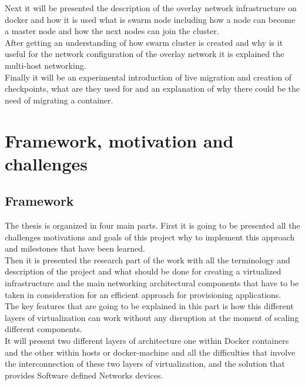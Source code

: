 Next it will be presented the description of the overlay network infrastructure on docker and how it is used what is swarm node including how a node can become a master node and how the next nodes can join the cluster.\\

After getting an understanding of how swarm cluster is created and why is it useful for the network configuration of the overlay network it is explained the multi-host networking.\\

Finally it will be an experimental introduction of live migration and creation of checkpoints, what are they used for and an explanation of why there could be the need of migrating a container.\\
 
\chapter{Framework, motivation and challenges} %

\label{ch:framework, motivation and challenges}

\section{Framework}

The thesis is organized in four main parts. First it is going to be presented all the challenges motivations and goals of this project why to implement this approach and milestones that have been learned.\\
 
Then it is presented the research part of the work with all the terminology and description of the project and what should be done for creating a virtualized infrastructure and the main networking architectural components that have to be taken in consideration for an efficient approach for provisioning applications.\\

The key features that are going to be explained in this part is how this different layers of virtualization can work without any disruption at the moment of scaling different components.\\

It will present two different layers of architecture one within Docker containers and the other within hosts or docker-machine and all the difficulties that involve the interconnection of these two layers of virtualization, and the solution that provides Software defined Networks devices.\\

